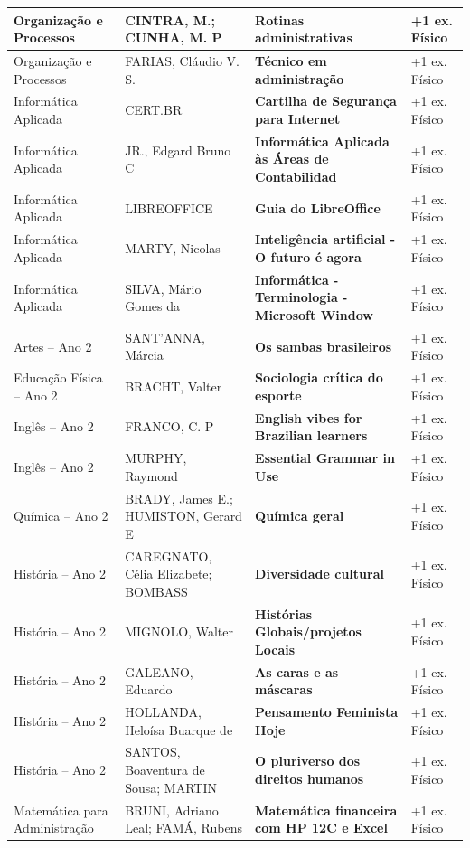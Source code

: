 \documentclass[10pt,a4paper]{article}
\begin{document}
\begin{xltabular}{\linewidth}{|p{3.8cm}|p{3.2cm}|X|p{2.2cm}|}
Organização e Processos & CINTRA, M.; CUNHA, M. P & \textbf{Rotinas administrativas} & +1 ex. Físico \\ \hline
Organização e Processos & FARIAS, Cláudio V. S. & \textbf{Técnico em administração} & +1 ex. Físico \\ \hline
Informática Aplicada & CERT.BR & \textbf{Cartilha de Segurança para Internet} & +1 ex. Físico \\ \hline
Informática Aplicada & JR., Edgard Bruno C & \textbf{Informática Aplicada às Áreas de Contabilidad} & +1 ex. Físico \\ \hline
Informática Aplicada & LIBREOFFICE & \textbf{Guia do LibreOffice} & +1 ex. Físico \\ \hline
Informática Aplicada & MARTY, Nicolas & \textbf{Inteligência artificial - O futuro é agora} & +1 ex. Físico \\ \hline
Informática Aplicada & SILVA, Mário Gomes da & \textbf{Informática - Terminologia - Microsoft Window} & +1 ex. Físico \\ \hline
Artes -- Ano 2 & SANT'ANNA, Márcia & \textbf{Os sambas brasileiros} & +1 ex. Físico \\ \hline
Educação Física -- Ano 2 & BRACHT, Valter & \textbf{Sociologia crítica do esporte} & +1 ex. Físico \\ \hline
Inglês -- Ano 2 & FRANCO, C. P & \textbf{English vibes for Brazilian learners} & +1 ex. Físico \\ \hline
Inglês -- Ano 2 & MURPHY, Raymond & \textbf{Essential Grammar in Use} & +1 ex. Físico \\ \hline
Química -- Ano 2 & BRADY, James E.; HUMISTON, Gerard E & \textbf{Química geral} & +1 ex. Físico \\ \hline
História -- Ano 2 & CAREGNATO, Célia Elizabete; BOMBASS & \textbf{Diversidade cultural} & +1 ex. Físico \\ \hline
História -- Ano 2 & MIGNOLO, Walter & \textbf{Histórias Globais/projetos Locais} & +1 ex. Físico \\ \hline
História -- Ano 2 & GALEANO, Eduardo & \textbf{As caras e as máscaras} & +1 ex. Físico \\ \hline
História -- Ano 2 & HOLLANDA, Heloísa Buarque de & \textbf{Pensamento Feminista Hoje} & +1 ex. Físico \\ \hline
História -- Ano 2 & SANTOS, Boaventura de Sousa; MARTIN & \textbf{O pluriverso dos direitos humanos} & +1 ex. Físico \\ \hline
Matemática para Administração & BRUNI, Adriano Leal; FAMÁ, Rubens & \textbf{Matemática financeira com HP 12C e Excel} & +1 ex. Físico \\ \hline

\end{xltabular}
\end{document}
